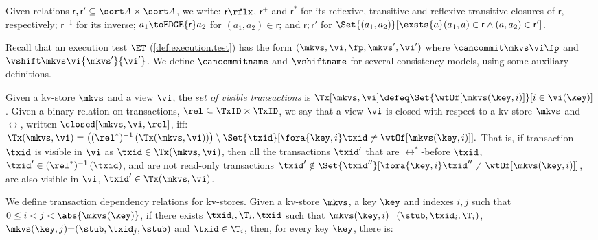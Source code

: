 Given relations \(\mathsf r, \mathsf r' \subseteq \sort A \times \sort A\),
we write:  \(\mathsf r\rflx\), \(\mathsf r^+\) and \(\mathsf r^*\) for its reflexive, transitive and reflexive-transitive closures of \(\mathsf r\), respectively;
\(\mathsf r^{-1}\) for its inverse;
\(a_1 \toEDGE{\mathsf r} a_2\) for \((a_1, a_2) \in \mathsf r\);
and \( \mathsf r; \mathsf r'\) for \( \Set{(a_1,a_2)}[\exsts{a} (a_1,a) \in \mathsf r\land (a,a_2) \in \mathsf r']\).

Recall that an  execution test \(\ET\) (\cref{def:execution.test})
has the form \((\mkvs,\vi, \fp, \allowbreak \mkvs', \vi')\) 
where  \(\cancommit \mkvs \vi \fp\) and \(\vshift \mkvs \vi {\mkvs'} {\vi'}\). 
We define \(\cancommitname\) and \(\vshiftname\) for several consistency
models, using some auxiliary definitions. 


Given a kv-store \(\mkvs\) and a view \(\vi\), the {\em set of visible
transactions} is
\( \Tx[\mkvs, \vi]  \defeq \Set{\wtOf[\mkvs(\key, i)] }[ i \in \vi(\key)] \).
Given a binary relation on transactions, \(\rel \subseteq \TxID \times \TxID\),
we say that a view \(\vi\) is closed with respect to a kv-store \(\mkvs\) and \(\rel\), written \(\closed[\mkvs,\vi,\rel]\), iff:  
\(
	\Tx(\mkvs, \vi) = 
	\left( (\rel^*)^{-1} \left( \Tx(\mkvs, \vi) \right) \right) \setminus \Set{\txid }[ \fora{\key,i} \txid \neq \wtOf[\mkvs(\key,i)] ] .
\)
That is, if transaction \(\txid\) is visible in \(\vi\) as \( \txid \in \Tx(\mkvs, \vi) \),
then all the transactions \( \txid'  \) that are \(\rel^*\)-before \(\txid\), \ie \(\txid' \in (\rel^*)^{-1} \left( \txid \right)\),
and are not read-only transactions \( \txid' \notin \Set{\txid'' }[ \fora{\key,i} \txid'' \neq \wtOf[\mkvs(\key,i)] ] \),
are also visible in \(\vi\), \ie \( \txid' \in \Tx(\mkvs, \vi) \).

We define transaction dependency relations for kv-stores.
Given a kv-store \(\mkvs\), a key \(\key\) and 
indexes \(i,j\) such that  \(0 \leq i < j < \abs{ \mkvs(\key) }\), 
if there exists \(\txid_i, \T_i, \txid\) such that 
\(\mkvs(\key, i)  {=} (\stub, \txid_{i}, \T_{i})\), \(\mkvs(\key,j) {=} (\stub, \txid_{j}, \stub)\)
and \(\txid \in \T_{i}\), 
then, for every key \( \key \), there is:

